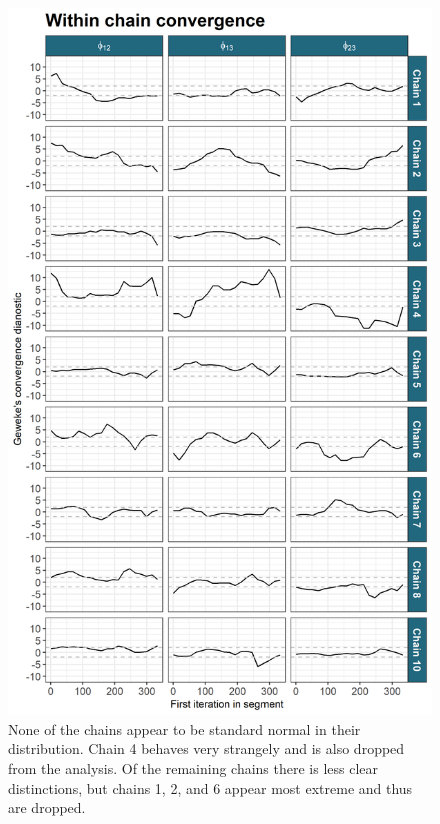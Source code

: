 \documentclass[]{article}
\begin{document}
\begin{figure}
	\centering
	\includegraphics[scale=0.7]{./Images/Yeast/Convergence/gewekePhiChain.png}
	\caption{None of the chains appear to be standard normal in their distribution. Chain 4 behaves very strangely and is also dropped from the analysis. Of the remaining chains there is less clear distinctions, but chains 1, 2, and 6 appear most extreme and thus are dropped.}
	\label{fig:gewekePhiPlot}
\end{figure}
\end{document}

